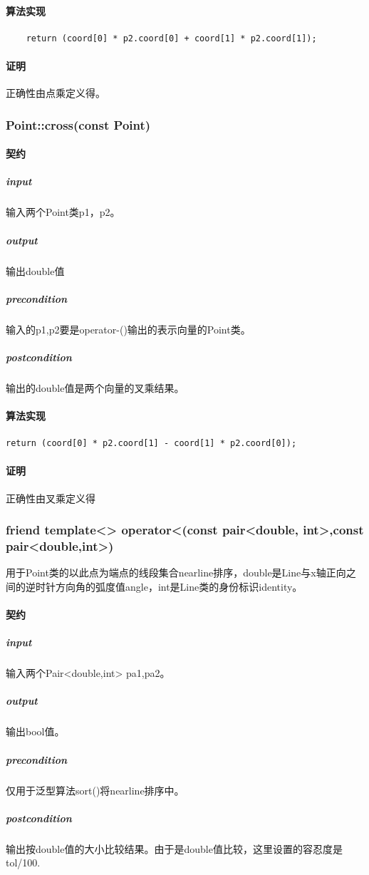 \documentclass[a4paper]{book}
\numberwithin{equation}{chapter}
\theoremstyle{definition}
\begin{document}
\paragraph{算法实现}
\begin{lstlisting}
	return (coord[0] * p2.coord[0] + coord[1] * p2.coord[1]);
\end{lstlisting}
\paragraph{证明}
正确性由点乘定义得。

\subsubsection{Point::cross(const Point)}
\paragraph{契约}
\subparagraph{input}
输入两个Point类p1，p2。
\subparagraph{output}
输出double值
\subparagraph{precondition}
输入的p1,p2要是operator-()输出的表示向量的Point类。
\subparagraph{postcondition}
输出的double值是两个向量的叉乘结果。
\paragraph{算法实现}
\begin{lstlisting}
return (coord[0] * p2.coord[1] - coord[1] * p2.coord[0]);
\end{lstlisting}
\paragraph{证明}
正确性由叉乘定义得

\subsubsection{friend template<> operator<(const pair<double, int>,const pair<double,int>)}
用于Point类的以此点为端点的线段集合nearline排序，double是Line与x轴正向之间的逆时针方向角的弧度值angle，int是Line类的身份标识identity。
\paragraph{契约}
\subparagraph{input}
输入两个Pair<double,int> pa1,pa2。
\subparagraph{output}
输出bool值。
\subparagraph{precondition}
仅用于泛型算法sort()将nearline排序中。
\subparagraph{postcondition}
输出按double值的大小比较结果。由于是double值比较，这里设置的容忍度是tol/100.
\end{document}
